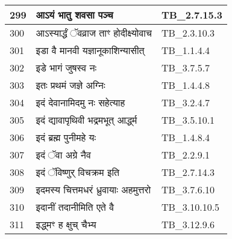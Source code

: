 \documentclass[17pt]{extarticle}
\begin{document}
\begin{longtable}{||p{0.4in}||p{4.9in}||p{0.9in}||}
    299 & आऽयं भातु शवसा पञ्च & TB\_2.7.15.3       \\
    
    \hline
        
    300 & आऽस्यार्द्धं ॅवव्राज ताꣳ होदीक्ष्योवाच & TB\_2.3.10.3       \\
    
    \hline
        
    301 & इडा वै मानवी यज्ञानूकाशिन्यासीत् & TB\_1.1.4.4       \\
    
    \hline
        
    302 & इडे भागं जुषस्व नः & TB\_3.7.5.7       \\
    
    \hline
        
    303 & इतः प्रथमं जज्ञे अग्निः & TB\_1.4.4.8       \\
    
    \hline
        
    304 & इदं देवानामिदमु नः सहेत्याह & TB\_3.2.4.7       \\
    
    \hline
        
    305 & इदं द्यावापृथिवी भद्रमभूत् आर्द्ध्म & TB\_3.5.10.1       \\
    
    \hline
        
    306 & इदं ब्रह्म पुनीमहे यः & TB\_1.4.8.4       \\
    
    \hline
        
    307 & इदं ॅवा अग्रे नैव & TB\_2.2.9.1       \\
    
    \hline
        
    308 & इदं ॅविष्णुर् विचक्रम इति & TB\_2.7.14.3       \\
    
    \hline
        
    309 & इदमस्य चित्तमधरं ध्रुवायाः अहमुत्तरो & TB\_3.7.6.10       \\
    
    \hline
        
    310 & इदानीं तदानीमिति एते वै & TB\_3.10.10.5       \\
    
    \hline
        
    311 & इद्ध्मꣳ ह क्षुच् चैभ्य & TB\_3.12.9.6       \\
    

\end{longtable}
\end{document}
